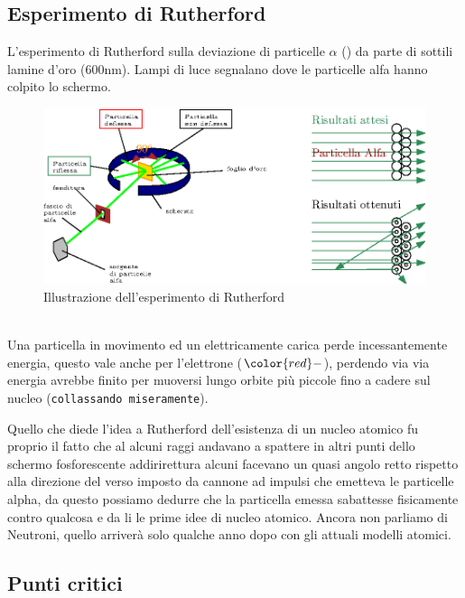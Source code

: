 \subsection{Esperimento di Rutherford}
\label{sec:esperimentodiruth}
L'esperimento di Rutherford sulla deviazione di particelle $\alpha$ () da parte di sottili lamine d'oro (600nm). Lampi di luce segnalano dove le particelle alfa hanno colpito lo schermo.
\begin{figure}[ht!]
  \centering
  \includegraphics{./img/espRuth.eps}
  \caption{Illustrazione dell'esperimento di Rutherford}
  \label{fig:espruther}
\end{figure}\\
Una particella in movimento ed un elettricamente carica perde incessantemente energia, questo vale
anche per l'elettrone (${\color{red}-}$), perdendo via via energia avrebbe finito per muoversi lungo
orbite più piccole fino a cadere sul nucleo ({\tt collassando miseramente}).
\begin{nota}
  Quello che diede l'idea a Rutherford dell'esistenza di un nucleo atomico fu proprio il fatto che
  al alcuni raggi andavano a spattere in altri punti dello schermo fosforescente addirirettura alcuni
  facevano un quasi angolo retto rispetto alla direzione del verso imposto da cannone ad impulsi che
  emetteva le particelle alpha, da questo possiamo dedurre che la particella emessa sabattesse
  fisicamente contro qualcosa e da li le prime idee di nucleo atomico. Ancora non parliamo di Neutroni,
  quello arriverà solo qualche anno dopo con gli attuali modelli atomici.
\end{nota}
\subsection{Punti critici}
\label{sec:punticriticirutherford}

